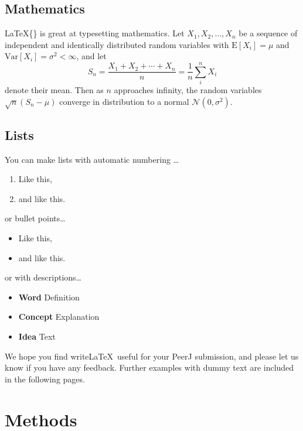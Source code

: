 \documentclass[fleqn,10pt,lineno]{wlpeerj} %
\providecommand{\tightlist}{
\setlength{\itemsep}{0pt}\setlength{\parskip}{0pt}}
\begin{document}
\hypertarget{mathematics}{%
\subsection*{Mathematics}\label{mathematics}}

\LaTeX\{\} is great at typesetting mathematics. Let
\(X_1, X_2, \ldots, X_n\) be a sequence of independent and identically
distributed random variables with \(\text{E}[X_i] = \mu\) and
\(\text{Var}[X_i] = \sigma^2 < \infty\), and let
\[S_n = \frac{X_1 + X_2 + \cdots + X_n}{n}
      = \frac{1}{n}\sum_{i}^{n} X_i\] denote their mean. Then as \(n\)
approaches infinity, the random variables \(\sqrt{n}(S_n - \mu)\)
converge in distribution to a normal \(\mathcal{N}(0, \sigma^2)\).

\hypertarget{lists}{%
\subsection*{Lists}\label{lists}}

You can make lists with automatic numbering \dots

\begin{enumerate}
\def\labelenumi{\arabic{enumi}.}
\tightlist
\item
  Like this,
\item
  and like this.
\end{enumerate}

or bullet points\ldots{}

\begin{itemize}
\tightlist
\item
  Like this,
\item
  and like this.
\end{itemize}

or with descriptions\ldots{}

\begin{itemize}
\tightlist
\item
  \textbf{Word} Definition
\item
  \textbf{Concept} Explanation
\item
  \textbf{Idea} Text
\end{itemize}

We hope you find write\LaTeX~useful for your PeerJ submission, and
please let us know if you have any feedback. Further examples with dummy
text are included in the following pages.

\hypertarget{methods}{%
\section*{Methods}\label{methods}}
\end{document}
